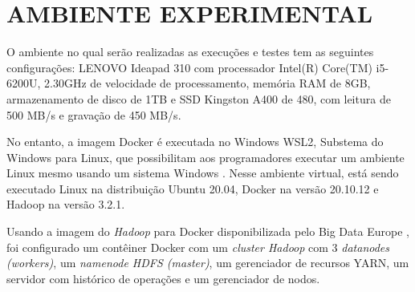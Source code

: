 \section{AMBIENTE EXPERIMENTAL} \label{sec:ambienteexperimental}

O ambiente no qual serão realizadas as execuções e testes tem as seguintes configurações: LENOVO Ideapad 310 com processador Intel(R) Core(TM) i5-6200U, 2.30GHz de velocidade de processamento,  memória RAM de 8GB, armazenamento de disco de 1TB e SSD Kingston A400 de 480, com leitura de 500 MB/s e gravação de 450 MB/s. 

No entanto, a imagem Docker é executada no Windows WSL2, Substema do Windows para Linux, que possibilitam aos programadores executar um ambiente Linux mesmo usando um sistema Windows \cite{MicrosoftWSL22}. Nesse ambiente virtual, está sendo executado Linux na distribuição Ubuntu 20.04, Docker na versão 20.10.12 e Hadoop na versão 3.2.1.

Usando a imagem do \textit{Hadoop} para Docker disponibilizada pelo Big Data Europe \cite{BigDataHadoopGithub}, foi configurado um contêiner Docker com um \textit{cluster Hadoop} com 3 \textit{datanodes (workers)}, um \textit{namenode HDFS (master)}, um gerenciador de recursos YARN, um servidor com histórico de operações e um gerenciador de nodos.
